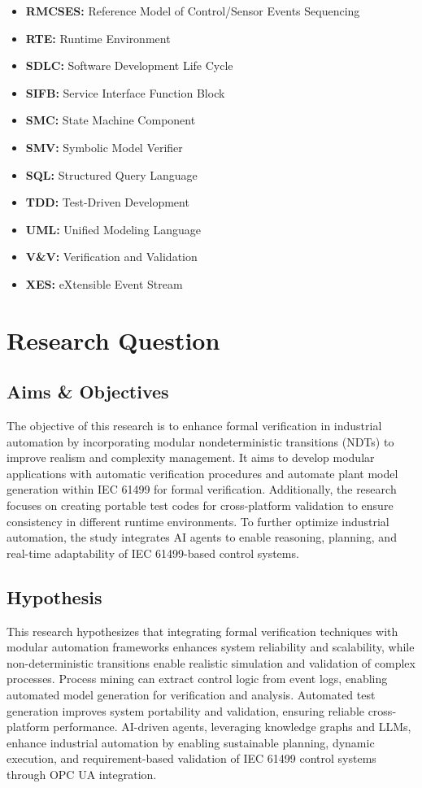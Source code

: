 \begin{itemize}
\item \textbf{RMCSES:} Reference Model of Control/Sensor Events Sequencing
\item \textbf{RTE:} Runtime Environment
\item \textbf{SDLC:} Software Development Life Cycle
\item \textbf{SIFB:} Service Interface Function Block
\item \textbf{SMC:} State Machine Component
\item \textbf{SMV:} Symbolic Model Verifier
\item \textbf{SQL:} Structured Query Language
\item \textbf{TDD:} Test-Driven Development
\item \textbf{UML:} Unified Modeling Language
\item \textbf{V\&V:} Verification and Validation
\item \textbf{XES:} eXtensible Event Stream
\end{itemize}

\section{Research Question}
\subsection{Aims \& Objectives}
The objective of this research is to enhance formal verification in industrial automation by incorporating modular nondeterministic transitions (NDTs) to improve realism and complexity management. It aims to develop modular applications with automatic verification procedures and automate plant model generation within IEC 61499 for formal verification. Additionally, the research focuses on creating portable test codes for cross-platform validation to ensure consistency in different runtime environments. To further optimize industrial automation, the study integrates AI agents to enable reasoning, planning, and real-time adaptability of IEC 61499-based control systems.

\subsection{Hypothesis}
This research hypothesizes that integrating formal verification techniques with modular automation frameworks enhances system reliability and scalability, while non-deterministic transitions enable realistic simulation and validation of complex processes. Process mining can extract control logic from event logs, enabling automated model generation for verification and analysis. Automated test generation improves system portability and validation, ensuring reliable cross-platform performance. AI-driven agents, leveraging knowledge graphs and LLMs, enhance industrial automation by enabling sustainable planning, dynamic execution, and requirement-based validation of IEC 61499 control systems through OPC UA integration.

